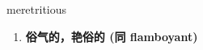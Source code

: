 
\begin{frame}
{\huge meretritious}
\begin{center}
\begin{enumerate}\Large
  \item \textbf{俗气的，艳俗的 (同 flamboyant)}
\end{enumerate}
\end{center}
\end{frame}
